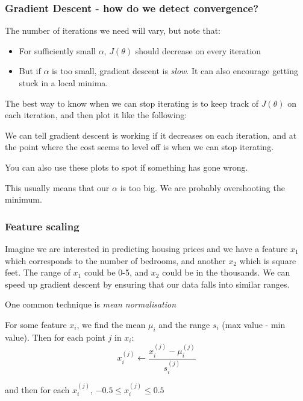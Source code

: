 \documentclass[12pt]{article}
\begin{document}
\subsubsection{Gradient Descent - how do we detect convergence?}

The number of iterations we need will vary, but note that:
\begin{itemize}
\item For sufficiently small $\alpha$, $J(\theta)$ should decrease on every iteration
\item But if $\alpha$ is too small, gradient descent is \textit{slow}. It can also encourage getting stuck in a local minima. 
\end{itemize}

The best way to know when we can stop iterating is to keep track of $J(\theta)$ on each iteration, and then plot it like the following:


We can tell gradient descent is working if it decreases on each iteration, and at the point where the cost seems to level off is when we can stop iterating. 

You can also use these plots to spot if something has gone wrong. 


This usually means that our $\alpha$ is too big. We are probably overshooting the minimum. 

\subsubsection{Feature scaling}

Imagine we are interested in predicting housing prices and we have a feature $x_1$ which corresponds to the number of bedrooms, and another $x_2$ which is square feet. The range of $x_1$ could be 0-5, and $x_2$ could be in the thousands. We can speed up gradient descent by ensuring that our data falls into similar ranges. 

One common technique is \textit{mean normalisation} 

For some feature $x_i$, we find the mean $\mu_i$ and the range $s_i$ (max value - min value). Then for each point $j$ in $x_i$:
\[
x_i^{(j)} \leftarrow \frac{x_i^{(j)} - \mu_i^{(j)}}{s_i^{(j)}}
\]

and then for each $x_i^{(j)} $, $-0.5 \leq x_i^{(j)}  \leq 0.5$
\end{document}
